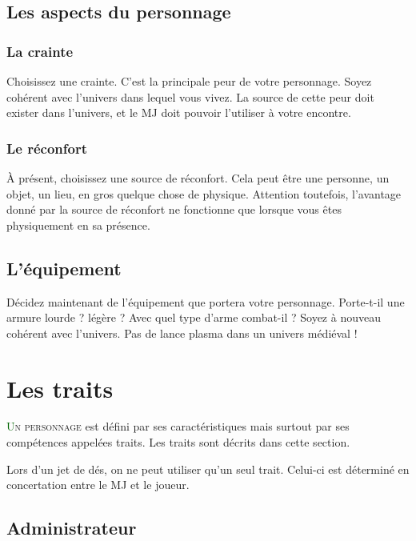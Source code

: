 \subsection{Les aspects du personnage}

\subsubsection*{La crainte}

Choisissez une crainte. C'est la principale peur de votre personnage. Soyez cohérent avec l'univers dans lequel vous vivez. La source de cette peur doit exister dans l'univers, et le MJ doit pouvoir l'utiliser à votre encontre.

\subsubsection*{Le réconfort}

À présent, choisissez une source de réconfort. Cela peut être une personne, un objet, un lieu, en gros quelque chose de physique. Attention toutefois, l'avantage donné par la source de réconfort ne fonctionne que lorsque vous êtes physiquement en sa présence.

\subsection{L'équipement}

Décidez maintenant de l'équipement que portera votre personnage. Porte-t-il une armure lourde ? légère ? Avec quel type d'arme combat-il ? Soyez à nouveau cohérent avec l'univers. Pas de lance plasma dans un univers médiéval !

\newpage

\section{Les traits}

\lettrine[lines=3]{\initfamily\textcolor{darkgreen}{U}}{n personnage} est défini par ses caractéristiques mais surtout par ses compétences appelées traits. Les traits sont décrits dans cette section.

Lors d'un jet de dés, on ne peut utiliser qu'un seul trait. Celui-ci est déterminé en concertation entre le MJ et le joueur.

\subsection*{Administrateur}

